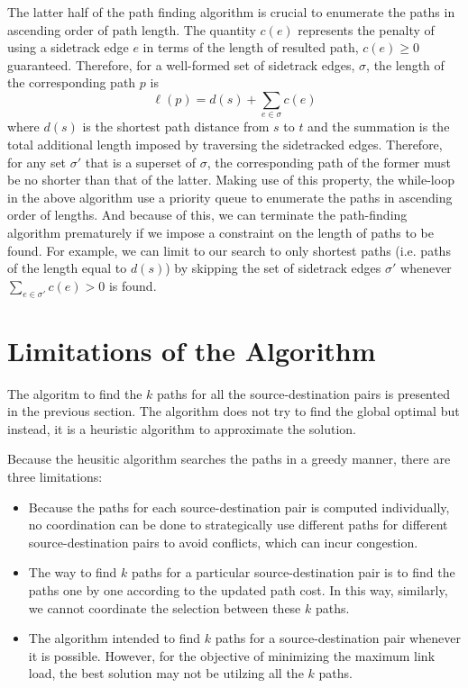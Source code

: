 \documentclass[conference]{IEEEtran}
\begin{document}
The latter half of the path finding algorithm is crucial to enumerate the paths
in ascending order of path length. The quantity $c(e)$ represents the penalty
of using a sidetrack edge $e$ in terms of the length of resulted path, $c(e)
\ge 0$ guaranteed. Therefore, for a well-formed set of sidetrack edges,
$\sigma$, the length of the corresponding path $p$ is \[
\ell(p) = d(s) + \sum_{e\in\sigma} c(e) \]
where $d(s)$ is the shortest path distance from $s$ to $t$ and the summation is
the total additional length imposed by traversing the sidetracked edges.
Therefore, for any set $\sigma'$ that is a superset of $\sigma$, the
corresponding path of the former must be no shorter than that of the latter.
Making use of this property, the while-loop in the above algorithm use a
priority queue to enumerate the paths in ascending order of lengths. And
because of this, we can terminate the path-finding algorithm prematurely if we
impose a constraint on the length of paths to be found. For example, we can
limit to our search to only shortest paths (i.e. paths of the length equal to
$d(s)$) by skipping the set of sidetrack edges $\sigma'$ whenever
$\sum_{e\in\sigma'} c(e) > 0$ is found.

\section{Limitations of the Algorithm}

The algoritm to find the $k$ paths for all the source-destination pairs is
presented in the previous section. The algorithm does not try to find the
global optimal but instead, it is a heuristic algorithm to approximate the
solution.

Because the heusitic algorithm searches the paths in a greedy manner, there are
three limitations:

\begin{itemize}
\item Because the paths for each source-destination pair is computed
individually, no coordination can be done to strategically use different paths
for different source-destination pairs to avoid conflicts, which can incur
congestion.
\item The way to find $k$ paths for a particular source-destination pair is to
find the paths one by one according to the updated path cost. In this way,
similarly, we cannot coordinate the selection between these $k$ paths.
\item The algorithm intended to find $k$ paths for a source-destination pair
whenever it is possible. However, for the objective of minimizing the maximum
link load, the best solution may not be utilzing all the $k$ paths.
\end{itemize}
\end{document}
